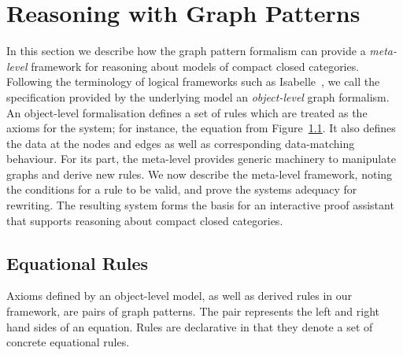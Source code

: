 \documentclass[runningheads]{llncs}
\begin{document}






\section{Reasoning with Graph Patterns}
\label{sec:rewriting}

In this section we describe how the graph pattern formalism can
provide a \emph{meta-level} framework for reasoning about models of
compact closed categories. Following the terminology of logical
frameworks such as Isabelle~\cite{isabelle}, we call the specification
provided by the underlying model an \emph{object-level} graph
formalism. An object-level formalisation defines a set of rules which
are treated as the axioms for the system; for instance, the equation
from Figure~\ref{}. It also defines the data at the nodes and edges as
well as corresponding data-matching behaviour.  For its part, the
meta-level provides generic machinery to manipulate graphs and derive
new rules.  We now describe the meta-level framework, noting the
conditions for a rule to be valid, and prove the systems adequacy for
rewriting. The resulting system forms the basis for an interactive
proof assistant that supports reasoning about compact closed
categories.

\subsection{Equational Rules}

Axioms defined by an object-level model, as well as derived rules in
our framework, are pairs of graph patterns. The pair represents the
left and right hand sides of an equation. Rules are declarative in
that they denote a set of concrete equational rules. 
\end{document}

